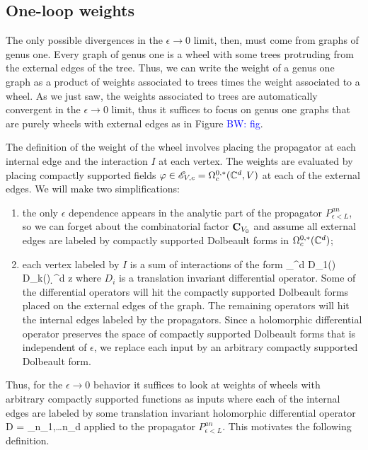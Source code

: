 \documentclass[10pt]{amsart}
\def\brian{\textcolor{blue}{BW: }\textcolor{blue}}
\begin{document}
\subsection{One-loop weights}

The only possible divergences in the $\epsilon \to 0$ limit, then, must come from graphs of genus one. 
Every graph of genus one is a wheel with some trees protruding from the external edges of the tree.
Thus, we can write the weight of a genus one graph as a product of weights associated to trees times the weight associated to a wheel.
As we just saw, the weights associated to trees are automatically convergent in the $\epsilon \to 0$ limit, thus it suffices to focus on genus one graphs that are purely wheels with external edges as in Figure \brian{fig}. 

The definition of the weight of the wheel involves placing the propagator at each internal edge and the interaction $I$ at each vertex. 
The weights are evaluated by placing compactly supported fields $\varphi \in \mathscr E_{V,c} = \Omega^{0,*}_c(\mathbb C^d, V)$ at each of the external edges.
We will make two simplifications:
\begin{enumerate}
\item the only $\epsilon$ dependence appears in the analytic part of the propagator $P_{\epsilon<L}^{an}$, so we can forget about the combinatorial factor ${\bf C}_{V_0}$ and assume all external edges are labeled by compactly supported Dolbeault forms in $\Omega^{0,*}_c(\mathbb C^d)$;
\item each vertex labeled by $I$ is a sum of interactions of the form
\ben
\int_{\CC^d} D_1(\varphi) \cdots D_k(\varphi) \d^d z
\een
where $D_i$ is a translation invariant differential operator. 
Some of the differential operators will hit the compactly supported Dolbeault forms placed on the external edges of the graph.
The remaining operators will hit the internal edges labeled by the propagators.
Since a holomorphic differential operator preserves the space of compactly supported Dolbeault forms that is independent of $\epsilon$, we replace each input by an arbitrary compactly supported Dolbeault form.
\end{enumerate}

Thus, for the $\epsilon \to 0$ behavior it suffices to look at weights of wheels with arbitrary compactly supported functions as inputs where each of the internal edges are labeled by some translation invariant holomorphic differential operator 
\ben
D = \sum_{n_1,\ldots n_d} \cdots {}
\een
applied to the propagator $P_{\epsilon<L}^{an}$.
This motivates the following definition. 
\end{document}
